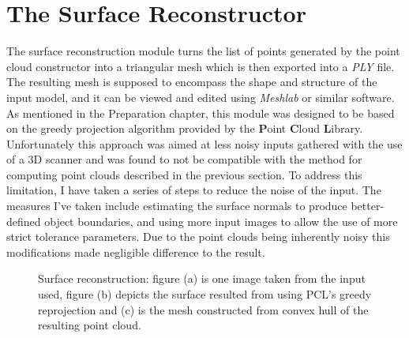 \documentclass[12pt,a4paper,twoside,openright]{report}
\begin{document}
\section{The Surface Reconstructor}
The surface reconstruction module turns the list of points generated by the point cloud constructor into a triangular mesh which is then exported into a \emph{PLY} file. The resulting mesh is supposed to encompass the shape and structure of the input model, and it can be viewed and edited using \emph{Meshlab} or similar software.\\
\linebreak
As mentioned in the Preparation chapter, this module was designed to be based on the greedy projection algorithm provided by the \textbf{P}oint \textbf{C}loud \textbf{L}ibrary\cite{Marton09ICRA}. Unfortunately this approach was aimed at less noisy inputs gathered with the use of a 3D scanner and was found to not be compatible with the method for computing point clouds described in the previous section. To address this limitation, I have taken a series of steps to reduce the noise of the input. The measures I've taken include estimating the surface normals to produce better-defined object boundaries, and using more input images to allow the use of more strict tolerance parameters. Due to the point clouds being inherently noisy this modifications made negligible difference to the result.\\



\begin{figure}

\begin{minipage}{.5\linewidth}
\centering
{}
\end{minipage}%
\begin{minipage}{.5\linewidth}
\centering
{}
\end{minipage}\par\medskip
\centering
{}

\caption{Surface reconstruction: figure (a) is one image taken from the input used\protect\footnotemark, figure (b) depicts the surface resulted from using PCL's greedy reprojection and (c) is the mesh constructed from convex hull of the resulting point cloud.}

\label{fig:main}
\end{figure}
\end{document}
